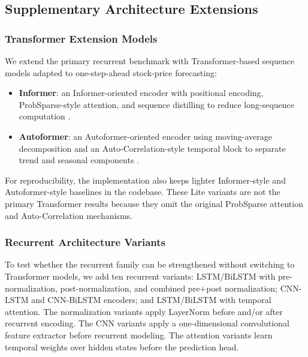 \subsection{Supplementary Architecture Extensions}
\subsubsection{Transformer Extension Models}
We extend the primary recurrent benchmark with Transformer-based sequence models adapted to one-step-ahead stock-price forecasting:
\begin{itemize}
    \item \textbf{Informer}: an Informer-oriented encoder with positional encoding, ProbSparse-style attention, and sequence distilling to reduce long-sequence computation \cite{zhou2020informer}.
    \item \textbf{Autoformer}: an Autoformer-oriented encoder using moving-average decomposition and an Auto-Correlation-style temporal block to separate trend and seasonal components \cite{wu2021autoformer}.
\end{itemize}
For reproducibility, the implementation also keeps lighter Informer-style and Autoformer-style baselines in the codebase. These Lite variants are not the primary Transformer results because they omit the original ProbSparse attention and Auto-Correlation mechanisms.

\subsubsection{Recurrent Architecture Variants}
To test whether the recurrent family can be strengthened without switching to Transformer models, we add ten recurrent variants: LSTM/BiLSTM with pre-normalization, post-normalization, and combined pre+post normalization; CNN-LSTM and CNN-BiLSTM encoders; and LSTM/BiLSTM with temporal attention. The normalization variants apply LayerNorm before and/or after recurrent encoding. The CNN variants apply a one-dimensional convolutional feature extractor before recurrent modeling. The attention variants learn temporal weights over hidden states before the prediction head.

